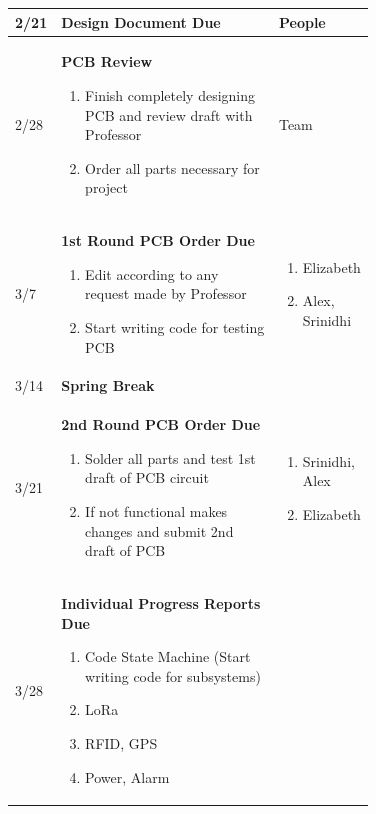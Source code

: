 \documentclass{article}
\begin{document}
\begin{figure}[H]
	\begin{center}
		\begin{tabular}{|p{0.05 \linewidth}|p{0.6 \linewidth}| p{0.2 \linewidth}| }
			\hline
			2/21 & \textbf{Design Document Due} & People \\
			\hline 
			2/28  & \textbf{PCB Review} \begin{enumerate}
				\item Finish completely designing PCB and review draft with Professor
				\item Order all parts necessary for project
			\end{enumerate} 
		 & Team \\
		 \hline 
		 3/7  & \textbf{1st Round PCB Order Due} \begin{enumerate}
		 	\item Edit according to any request made by Professor
		 	\item Start writing code for testing PCB
		 \end{enumerate} 
		 & \begin{enumerate}
		 	\item Elizabeth
		 	\item Alex, Srinidhi
		 \end{enumerate} \\
		 3/14  & \textbf{Spring Break} &  \\
		 \hline 
		 3/21  & \textbf{2nd Round PCB Order Due} \begin{enumerate}
		 	\item Solder all parts and test 1st draft of PCB circuit
		 	\item If not functional makes changes and submit 2nd draft of PCB
		 \end{enumerate} 
		 & \begin{enumerate}
		 	\item Srinidhi, Alex
		 	\item Elizabeth
		 \end{enumerate} \\
		 \hline 
		 3/28  & \textbf{Individual Progress Reports Due} \begin{enumerate}
		 	\item Code State Machine (Start writing code for subsystems)
		 	\item LoRa
		 	\item RFID, GPS
		 	\item Power, Alarm
		 \end{enumerate} 

\end{tabular}
\end{center}
\end{figure}
\end{document}
